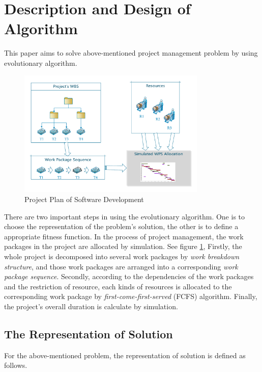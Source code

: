 %
%

\section{Description and Design of Algorithm}
%
This paper aims to solve above-mentioned project management problem by using
evolutionary algorithm.

\begin{figure}[!ht]
  \centering
  \includegraphics[width=0.8\textwidth]{figures/simu.pdf}
  \caption{Project Plan of Software Development}
  \label{fig:simu}
\end{figure}


There are two important steps in using the evolutionary algorithm. One is to
choose the representation of the problem's solution, the other is to define a
appropriate fitness function. In the process of project management, the work
packages in the project are allocated by simulation. See figure \ref{fig:simu}, Firstly, the
whole project is decomposed into several work packages by \emph{work breakdown
  structure}, and those work packages are arranged into a corresponding
\emph{work package sequence}. Secondly, according to the dependencies of the
work packages and the restriction of resource, each kinds of resources is
allocated to the corresponding work package by \emph{first-come-first-served}
(FCFS) algorithm. Finally, the project's overall duration is calculate by
simulation.


\subsection{The Representation of Solution}
%
For the above-mentioned problem, the representation of solution is defined as
follows.


